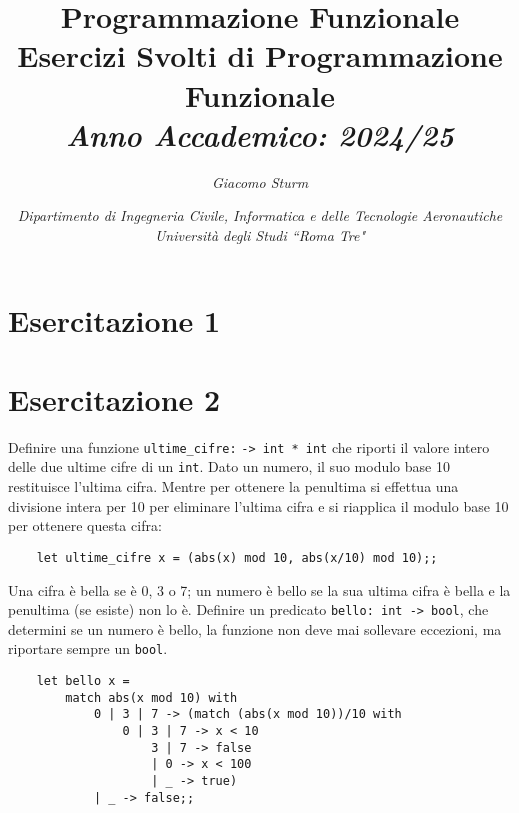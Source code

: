 \documentclass{article}
\numberwithin{equation}{subsection}
\begin{document}
\title{%
    \textbf{Programmazione Funzionale}  \\ 
    \large Esercizi Svolti di Programmazione Funzionale \\
    \textit{Anno Accademico: 2024/25}}
\author{\textit{Giacomo Sturm}}
\date{\textit{Dipartimento di Ingegneria Civile, Informatica e delle Tecnologie Aeronautiche \\
Università degli Studi ``Roma Tre"}}

\maketitle
\thispagestyle{link}

\clearpage


\pagestyle{fancy}
\fancyhead{}\fancyfoot{}
\fancyfoot[C]{\thepage}

\tableofcontents

\clearpage
{}


\section{Esercitazione 1}

\clearpage

\section{Esercitazione 2}
Definire una funzione \verb|ultime_cifre:| \verb|-> int * int| che riporti il valore intero delle due ultime cifre di un \verb|int|. Dato un numero, il suo modulo base 10 restituisce l'ultima cifra. Mentre per ottenere la penultima si effettua una divisione intera per 10 per eliminare l'ultima cifra e si riapplica il modulo base 10 per ottenere questa cifra:
\begin{verbatim}
    let ultime_cifre x = (abs(x) mod 10, abs(x/10) mod 10);;
\end{verbatim}


Una cifra è bella se è 0, 3 o 7; un numero è bello se la sua ultima cifra è bella e la penultima (se esiste) non lo è. Definire un predicato \verb|bello: int -> bool|, che determini se un numero è bello, la funzione non deve mai sollevare eccezioni, ma riportare sempre un \verb|bool|. 
\begin{verbatim}
    let bello x = 
        match abs(x mod 10) with
            0 | 3 | 7 -> (match (abs(x mod 10))/10 with
                0 | 3 | 7 -> x < 10
                    3 | 7 -> false
                    | 0 -> x < 100
                    | _ -> true)
            | _ -> false;;
\end{verbatim}
\end{document}
